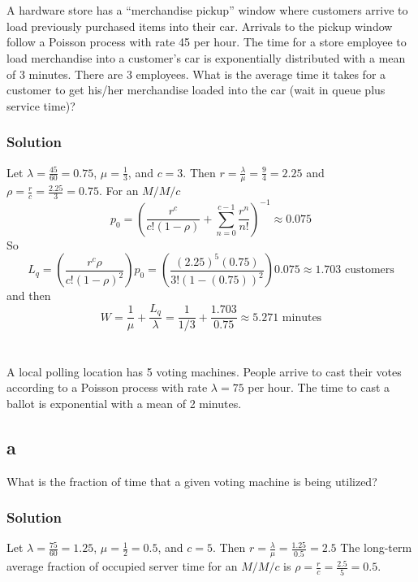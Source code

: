 \documentclass[letterpaper]{amsart}
\begin{document}
\section{} %
A hardware store has a ``merchandise pickup'' window where customers arrive to
load previously purchased items into their car. Arrivals to the pickup window
follow a Poisson process with rate 45 per hour. The time for a store employee to
load merchandise into a customer’s car is exponentially distributed with a mean of
3 minutes. There are 3 employees. What is the average time it takes for a
customer to get his/her merchandise loaded into the car (wait in queue plus
service time)?
\subsubsection*{Solution}
Let $\lambda = \frac{45}{60} = 0.75$, $\mu=\frac{1}{3}$,
and $c=3$. Then $r=\frac{\lambda}{\mu}=\frac{9}{4}=2.25$ and $\rho = \frac{r}{c} = \frac{2.25}{3} = 0.75$.
For an $M/M/c$
\begin{equation*}
  p_0=\left( \frac{r^c}{c!(1-\rho)}+\sum_{n=0}^{c-1}\frac{r^n}{n!}\right)^{-1}\approx 0.075
\end{equation*}
So
\begin{equation*}
  L_q=\left( \frac{r^c\rho}{c!(1-\rho)^2}\right)p_0
  =\left( \frac{(2.25)^5(0.75)}{3!(1-(0.75))^2}\right)0.075\approx 1.703\text{ customers}
\end{equation*}
and then
\begin{equation*}
  W = \frac{1}{\mu}+\frac{L_q}{\lambda}
  =\frac{1}{1/3}+\frac{1.703}{0.75}
  \approx 5.271\text{ minutes}
\end{equation*}

\section{} %
A local polling location has 5 voting machines. People arrive to cast their votes
according to a Poisson process with rate $\lambda=75$ per hour. The time to cast a ballot
is exponential with a mean of 2 minutes.
\subsection*{a}
What is the fraction of time that a given voting machine is being utilized?
\subsubsection*{Solution}
Let $\lambda = \frac{75}{60} = 1.25$, $\mu=\frac{1}{2}=0.5$,
and $c=5$. Then $r=\frac{\lambda}{\mu}=\frac{1.25}{0.5}=2.5$
The long-term average fraction of occupied server time for an $M/M/c$ is $\rho = \frac{r}{c} = \frac{2.5}{5} = 0.5$.
\end{document}
